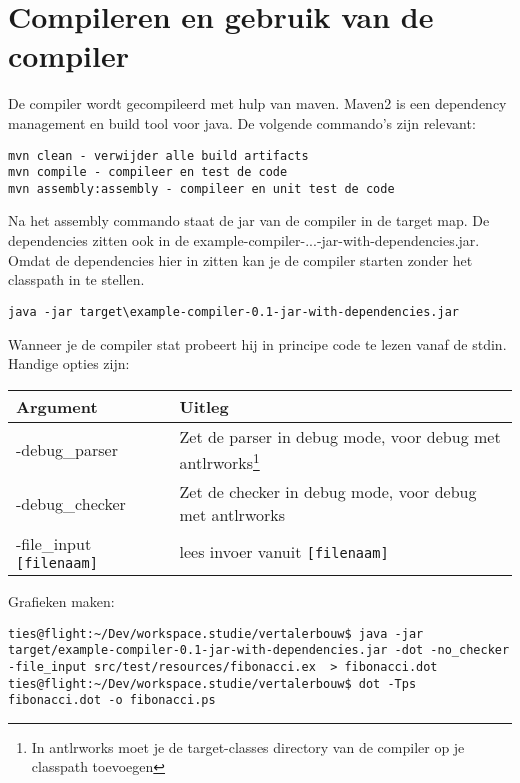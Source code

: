 \section{Compileren en gebruik van de compiler}
De compiler wordt gecompileerd met hulp van maven. Maven2 is een dependency management en build tool voor java. De volgende commando's zijn relevant:

\begin{verbatim}
mvn clean - verwijder alle build artifacts
mvn compile - compileer en test de code
mvn assembly:assembly - compileer en unit test de code
\end{verbatim}

Na het assembly commando staat de jar van de compiler in de target map. De dependencies zitten ook in de example-compiler-...-jar-with-dependencies.jar. Omdat de dependencies hier in zitten kan je de compiler starten zonder het classpath in te stellen.

\begin{verbatim}
java -jar target\example-compiler-0.1-jar-with-dependencies.jar
\end{verbatim}

Wanneer je de compiler stat probeert hij in principe code te lezen vanaf de stdin. Handige opties zijn:
\begin{tabular*}{0.75\textwidth}{|l | p{5cm} |}
	\hline
	Argument		&	Uitleg \\
	\hline
	-debug\_parser	& Zet de parser in debug mode, voor debug met antlrworks\footnote{In antlrworks moet je de target-classes directory van de compiler op je classpath toevoegen} \\
	-debug\_checker	& Zet de checker in debug mode, voor debug met antlrworks \\
	-file\_input \verb+[filenaam]+ & lees invoer vanuit \verb+[filenaam]+ \\
\end{tabular*}

Grafieken maken:
\begin{verbatim}
ties@flight:~/Dev/workspace.studie/vertalerbouw$ java -jar target/example-compiler-0.1-jar-with-dependencies.jar -dot -no_checker -file_input src/test/resources/fibonacci.ex  > fibonacci.dot
ties@flight:~/Dev/workspace.studie/vertalerbouw$ dot -Tps fibonacci.dot -o fibonacci.ps
\end{verbatim}
